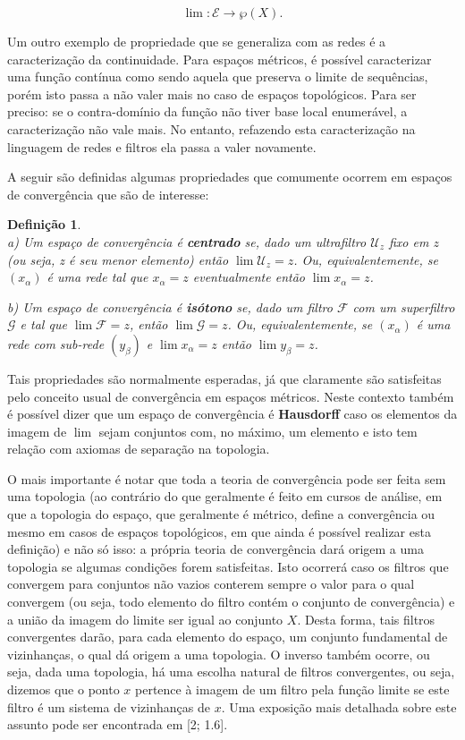 \documentclass[12pt, a4paper]{article}
\newtheorem{mydef}{Definição}[section]
\theoremstyle{definition}
\begin{document}
$$\lim :\mathcal{E} \rightarrow \wp (X).$$


Um outro exemplo de propriedade que se generaliza com as redes é a caracterização da continuidade. Para espaços métricos, é possível caracterizar uma função contínua como sendo aquela que preserva o limite de sequências, porém isto passa a não valer mais no caso de espaços topológicos. Para ser preciso: se o contra-domínio da função não tiver base local enumerável, a caracterização não vale mais. No entanto, refazendo esta caracterização na linguagem de redes e filtros ela passa a valer novamente. 

A seguir são definidas algumas propriedades que comumente ocorrem em espaços de convergência que são de interesse:

\begin{mydef} \ \\
	
a) Um espaço de convergência é \textbf{centrado} se, dado um ultrafiltro $\mathcal{U}_z$ fixo em $z$ (ou seja, z é seu menor elemento) então $\lim \mathcal{U}_z = z$. Ou, equivalentemente, se $(x_\alpha )$ é uma rede tal que $x_\alpha=z$ eventualmente então $\lim x_\alpha = z$. \

b) Um espaço de convergência é \textbf{isótono} se, dado um filtro $\mathcal{F}$ com um superfiltro $\mathcal{G}$ e tal que $\lim \mathcal{F} = z$, então $\lim \mathcal{G} = z$. Ou, equivalentemente, se $(x_\alpha )$ é uma rede com sub-rede $(y_\beta )$ e $\lim x_\alpha = z$ então $\lim y_\beta = z$. 
	
\end{mydef}

Tais propriedades são normalmente esperadas, já que claramente são satisfeitas pelo conceito usual de convergência em espaços métricos. Neste contexto também é possível dizer que um espaço de convergência é \textbf{Hausdorff} caso os elementos da imagem de $\lim$ sejam conjuntos com, no máximo, um elemento e isto tem relação com axiomas de separação na topologia. 

O mais importante é notar que toda a teoria de convergência pode ser feita sem uma topologia (ao contrário do que geralmente é feito em cursos de análise, em que a topologia do espaço, que geralmente é métrico, define a convergência ou mesmo em casos de espaços topológicos, em que ainda é possível realizar esta definição) e não só isso: a própria teoria de convergência dará origem a uma topologia se algumas condições forem satisfeitas. Isto ocorrerá caso os filtros que convergem para conjuntos não vazios conterem sempre o valor para o qual convergem (ou seja, todo elemento do filtro contém o conjunto de convergência) e a união da imagem do limite ser igual ao conjunto $X$. Desta forma, tais filtros convergentes darão, para cada elemento do espaço, um conjunto fundamental de vizinhanças, o qual dá origem a uma topologia. O inverso também ocorre, ou seja, dada uma topologia, há uma escolha natural de filtros convergentes, ou seja, dizemos que o ponto $x$ pertence à imagem de um filtro pela função limite se este filtro é um sistema de vizinhanças de $x$. Uma exposição mais detalhada sobre este assunto pode ser encontrada em [2; 1.6].
\end{document}

